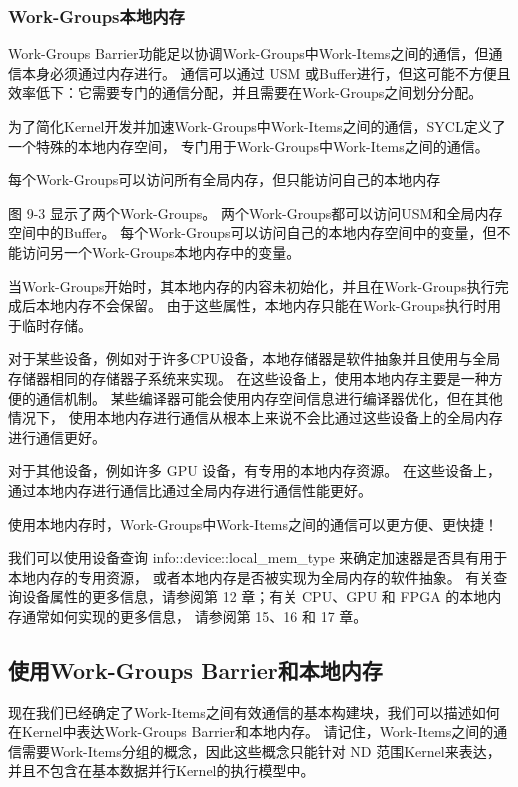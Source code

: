 \subsubsection{Work-Groups本地内存}
Work-Groups Barrier功能足以协调Work-Groups中Work-Items之间的通信，但通信本身必须通过内存进行。 
通信可以通过 USM 或Buffer进行，但这可能不方便且效率低下：它需要专门的通信分配，并且需要在Work-Groups之间划分分配。

为了简化Kernel开发并加速Work-Groups中Work-Items之间的通信，SYCL定义了一个特殊的本地内存空间，
专门用于Work-Groups中Work-Items之间的通信。

{\color{red} 每个Work-Groups可以访问所有全局内存，但只能访问自己的本地内存}

图 9-3 显示了两个Work-Groups。 两个Work-Groups都可以访问USM和全局内存空间中的Buffer。 
每个Work-Groups可以访问自己的本地内存空间中的变量，但不能访问另一个Work-Groups本地内存中的变量。

当Work-Groups开始时，其本地内存的内容未初始化，并且在Work-Groups执行完成后本地内存不会保留。 
由于这些属性，本地内存只能在Work-Groups执行时用于临时存储。

对于某些设备，例如对于许多CPU设备，本地存储器是软件抽象并且使用与全局存储器相同的存储器子系统来实现。 
在这些设备上，使用本地内存主要是一种方便的通信机制。 
某些编译器可能会使用内存空间信息进行编译器优化，但在其他情况下，
使用本地内存进行通信从根本上来说不会比通过这些设备上的全局内存进行通信更好。

对于其他设备，例如许多 GPU 设备，有专用的本地内存资源。 
在这些设备上，通过本地内存进行通信比通过全局内存进行通信性能更好。

\begin{remark}
	使用本地内存时，Work-Groups中Work-Items之间的通信可以更方便、更快捷！
\end{remark}

我们可以使用设备查询 info::device::local\_mem\_type 来确定加速器是否具有用于本地内存的专用资源，
或者本地内存是否被实现为全局内存的软件抽象。 
有关查询设备属性的更多信息，请参阅第 12 章；有关 CPU、GPU 和 FPGA 的本地内存通常如何实现的更多信息，
请参阅第 15、16 和 17 章。

\subsection{使用Work-Groups Barrier和本地内存}
现在我们已经确定了Work-Items之间有效通信的基本构建块，我们可以描述如何在Kernel中表达Work-Groups Barrier和本地内存。 
请记住，Work-Items之间的通信需要Work-Items分组的概念，因此这些概念只能针对 ND 范围Kernel来表达，
并且不包含在基本数据并行Kernel的执行模型中。

